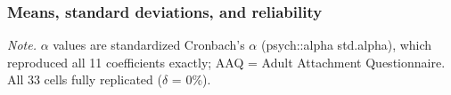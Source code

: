 \documentclass[
  english,
  man,floatsintext]{apa6}
\begin{document}
\subsubsection{Means, standard deviations, and reliability}\label{means-standard-deviations-and-reliability}

\begin{center}
\begin{ThreePartTable}

\begin{TableNotes}[para]
\normalsize{\textit{Note.} $\alpha$ values are standardized Cronbach's $\alpha$ (psych::alpha std.alpha), which reproduced all 11 coefficients exactly; AAQ = Adult Attachment Questionnaire. All 33 cells fully replicated ($\delta$ = 0\%).}
\end{TableNotes}

\small{

}
\end{ThreePartTable}
\end{center}
\end{document}
